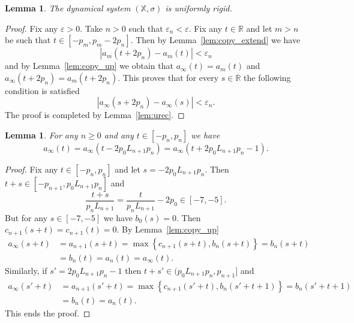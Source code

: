\documentclass[reqno,a4paper,12pt]{amsart}
\newtheorem{lem}[thm]{Lemma}
\theoremstyle{definition}
\numberwithin{equation}{section}
\begin{document}
\begin{lem}\label{lem:urigid}
The dynamical system $(\mathbb{X},\sigma)$ is uniformly rigid.
\end{lem}
\begin{proof}
Fix any ${\varepsilon}>0$.
Take $n>0$ such that ${\varepsilon}_n<{\varepsilon}$.
Fix any $t\in {\mathbb{R}}$ and let $m>n$ be such that $t\in [-p_m,p_m-2 p_n]$. Then by Lemma~\ref{lem:copy_extend} we have
\[|a_m(t+2p_n)-a_m(t)|<{\varepsilon}_n\]
and by Lemma~\ref{lem:copy_up} we obtain that $a_\infty(t)=a_m(t)$ and $a_\infty(t+2p_n)=a_m(t+2p_n)$.
This proves that for every $s\in {\mathbb{R}}$ the following condition is satisfied
\[|a_\infty(s+2p_n)-a_\infty(s)|<{\varepsilon}_n.\]
The proof is completed by Lemma~\ref{lem:urec}.
\end{proof}

\begin{lem}\label{lem:returns}
For any $n\geq 0$ and any $t\in [-p_{n},p_{n}]$
we have
\[a_\infty(t)=a_\infty(t-2p_0 L_{n+1}p_n)=a_\infty(t+2p_0 L_{n+1}p_n-1).\]
\end{lem}
\begin{proof}
Fix any $t\in [-p_n,p_n]$ and let $s=-2p_0 L_{n+1}p_n$. Then
$t+s\in [-p_{n+1},p_0 L_{n+1}p_n]$ and
\[\frac{t+s}{p_nL_{n+1}}=\frac{t}{p_nL_{n+1}}-2p_0\in[-7,-5].\]
But for any $s\in [-7,-5]$ we have $b_0(s)=0$.
Then $c_{n+1}(s+t)=c_{n+1}(t)=0$.
By Lemma~\ref{lem:copy_up}
\begin{align*}
a_\infty(s+t)&=a_{n+1}(s+t)=\max{\left\{{c_{n+1}(s+t),b_n(s+t)}\right\}}=b_n(s+t)\\
&=b_n(t)= a_n(t)=a_\infty(t).
\end{align*}
Similarly, if $s'=2p_0L_{n+1}p_n-1$ then $t+s'\in (p_0 L_{n+1} p_n,p_{n+1}]$ and
\begin{align*}
a_\infty(s'+t)&=a_{n+1}(s'+t)=\max{\left\{{c_{n+1}(s'+t),b_n(s'+t+1)}\right\}}=b_n(s'+t+1)\\
&=b_n(t)=a_n(t).
\end{align*}
This ends the proof.
\end{proof}
\end{document}
